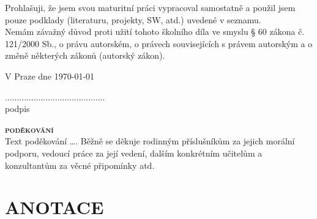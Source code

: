 \documentclass[12pt,a4paper]{article} %
\begin{document}
{Prohlašuji, že jsem svou maturitní práci vypracoval samostatně a použil jsem pouze podklady (literaturu, projekty, SW, atd.) uvedené v seznamu.
}\\

{Nemám závažný důvod proti užití tohoto školního díla ve smyslu § 60 zákona č. 121/2000 Sb., o právu autorském, o právech souvisejících s právem autorským a o změně některých zákonů (autorský zákon).}\\[0.5cm]

\begin{minipage}{0.49\textwidth}
\begin{flushleft}
{V Praze dne \today}\\%
\bigskip
\bigskip
\end{flushleft}
\end{minipage}
\begin{minipage}{0.49\textwidth}
\begin{flushright}
\centering
{
..........................................\\
podpis
}
\end{flushright}
\end{minipage}

\newpage
\textsc{\textbf{\fontsize{20pt}{0}\selectfont poděkování}}\\

{\color{red} Text poděkování …. Běžně se děkuje rodinným příslušníkům za jejich morální podporu, vedoucí práce za její vedení, dalším konkrétním učitelům a konzultantům za věcné připomínky atd.}

\newpage
\section*{ANOTACE}
\end{document}
